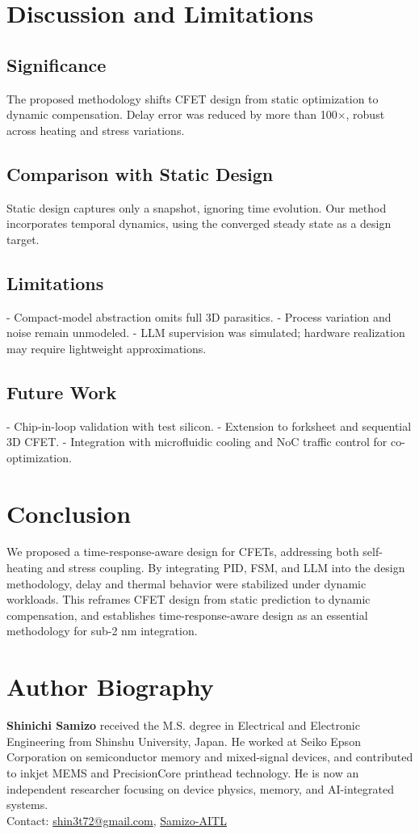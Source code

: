 \documentclass[conference]{IEEEtran}
\begin{document}
\section{Discussion and Limitations}
\subsection{Significance}
The proposed methodology shifts CFET design from static optimization to dynamic compensation. Delay error was reduced by more than 100$\times$, robust across heating and stress variations.  

\subsection{Comparison with Static Design}
Static design captures only a snapshot, ignoring time evolution. Our method incorporates temporal dynamics, using the converged steady state as a design target.  

\subsection{Limitations}
- Compact-model abstraction omits full 3D parasitics.  
- Process variation and noise remain unmodeled.  
- LLM supervision was simulated; hardware realization may require lightweight approximations.  

\subsection{Future Work}
- Chip-in-loop validation with test silicon.  
- Extension to forksheet and sequential 3D CFET.  
- Integration with microfluidic cooling and NoC traffic control for co-optimization.  

\section{Conclusion}
We proposed a time-response-aware design for CFETs, addressing both self-heating and stress coupling. By integrating PID, FSM, and LLM into the design methodology, delay and thermal behavior were stabilized under dynamic workloads. This reframes CFET design from static prediction to dynamic compensation, and establishes time-response-aware design as an essential methodology for sub-2 nm integration.  




\section*{Author Biography}
\noindent\textbf{Shinichi Samizo} received the M.S. degree in Electrical and Electronic Engineering from Shinshu University, Japan. He worked at Seiko Epson Corporation on semiconductor memory and mixed-signal devices, and contributed to inkjet MEMS and PrecisionCore printhead technology. He is now an independent researcher focusing on device physics, memory, and AI-integrated systems.\\
Contact: \href{mailto:shin3t72@gmail.com}{shin3t72@gmail.com}, \href{https://github.com/Samizo-AITL}{Samizo-AITL}
\end{document}
